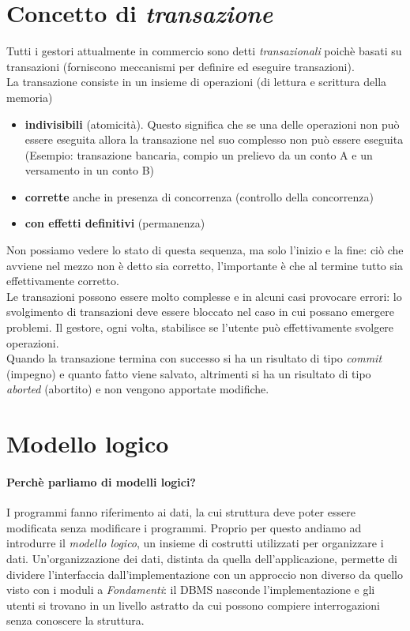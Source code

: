 \section{Concetto di \emph{transazione}}
Tutti i gestori attualmente in commercio sono detti \emph{transazionali} poichè basati su transazioni (forniscono meccanismi per definire ed eseguire transazioni).\\
La transazione consiste in un insieme di operazioni (di lettura e scrittura della memoria)
\begin{itemize}
	\item \textbf{indivisibili} (atomicità). Questo significa che se una delle operazioni non può essere eseguita allora la transazione nel suo complesso non può essere eseguita (Esempio: transazione bancaria, compio un prelievo da un conto A e un versamento in un conto B)
	\item \textbf{corrette} anche in presenza di concorrenza (controllo della concorrenza)
	\item \textbf{con effetti definitivi} (permanenza)
\end{itemize} Non possiamo vedere lo stato di questa sequenza, ma solo l'inizio e la fine: ciò che avviene nel mezzo non è detto sia corretto, l'importante è che al termine tutto sia effettivamente corretto.\\
Le transazioni possono essere molto complesse e in alcuni casi provocare errori: lo svolgimento di transazioni deve essere bloccato nel caso in cui possano emergere problemi. Il gestore, ogni volta, stabilisce se l'utente può effettivamente svolgere operazioni.\\
Quando la transazione termina con successo si ha un risultato di  tipo \emph{commit} (impegno) e quanto fatto viene salvato, altrimenti si ha un risultato di tipo \emph{aborted} (abortito) e non vengono apportate modifiche.
\section{Modello logico}
\paragraph{Perchè parliamo di modelli logici?} I programmi fanno riferimento ai dati, la cui struttura deve poter essere modificata senza modificare i programmi. Proprio per questo andiamo ad introdurre il \emph{modello logico}, un insieme di costrutti utilizzati per organizzare i dati. Un'organizzazione dei dati, distinta da quella dell'applicazione, permette di dividere l'interfaccia dall'implementazione con un approccio non diverso da quello visto con i moduli a \emph{Fondamenti}: il DBMS nasconde  l'implementazione e gli utenti si trovano in un livello astratto da cui possono compiere interrogazioni senza conoscere la struttura.
